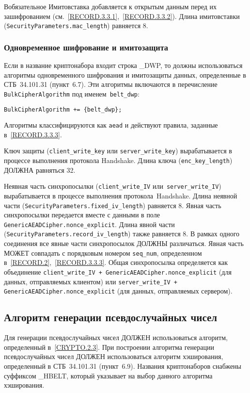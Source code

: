 \begin{appendix}{В}{обязательное}
Имитовставка добавляется к открытым данным перед их зашифрованием
(см.~\ref{RECORD.3.3.1},~\ref{RECORD.3.3.2}). Длина имитовставки
(\lstinline{SecurityParameters.mac_length}) равняется 8.

\subsubsection{Одновременное шифрование и имитозащита}\label{BSUITES.2.1.3}

Если в название криптонабора входит строка \_DWP, то должны использоваться 
алгоритмы одновременного шифрования и имитозащиты данных, определенные в 
СТБ~34.101.31 (пункт~6.7). Эти алгоритмы включаются в перечисление 
\lstinline{BulkCipherAlgorithm} под именем~\lstinline{belt_dwp}: 
\begin{lstlisting}
BulkCipherAlgorithm += {belt_dwp};
\end{lstlisting}

Алгоритмы классифицируются как \lstinline{aead} и действуют правила, 
заданные в~\ref{RECORD.3.3.3}. 

Ключ защиты (\lstinline{client_write_key} или 
\lstinline{server_write_key}) вырабатывается в процессе выполнения 
протокола Handshake. Длина ключа (\lstinline{enc_key_length})  
ДОЛЖНА равняться 32. 

Неявная часть синхропосылки (\lstinline{client_write_IV} 
или~\lstinline{server_write_IV}) 
вырабатывается в процессе выполнения протокола~Handshake. Длина неявной  
части (\lstinline{SecurityParameters.fixed_iv_length}) равняется 8. 
Явная часть синхропосылки передается вместе с данными в поле 
\mbox{\lstinline{GenericAEADCipher.nonce_explicit}.} 
%
Длина явной части (\lstinline{SecurityParameters.record_iv_length}) 
также равняется 8. В рамках одного соединения все явные части синхропосылок 
ДОЛЖНЫ различаться. Явная часть МОЖЕТ совпадать с порядковым номером 
\lstinline{seq_num}, определенном в~\ref{RECORD.2},~\ref{RECORD.3.3.3}.  
%
Общая синхропосылка определяется как объединение 
\mbox{\lstinline{client_write_IV + GenericAEADCipher.nonce_explicit}} 
(для данных, отправляемых клиентом) или 
\mbox{\lstinline{server_write_IV + GenericAEADCipher.nonce_explicit}} 
(для данных, отправляемых сервером).  

\subsection{Алгоритм генерации псевдослучайных чисел}\label{BSUITES.2.2}

Для генерации псевдослучайных чисел ДОЛЖЕН использоваться алгоритм, 
определенный в~\ref{CRYPTO.2.3}. При построении алгоритма генерации псевдослучайных 
чисел ДОЛЖЕН использоваться алгоритм хэширования, определенный в СТБ~34.101.31 
(пункт~6.9). Названия криптонаборов снабжены суффиксом \_HBELT, 
который указывает на выбор данного алгоритма хэширования. 


\end{appendix}
